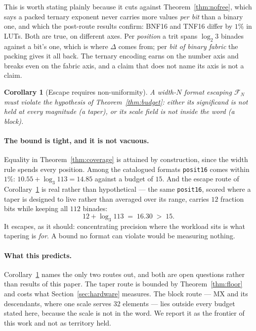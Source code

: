 \documentclass[11pt]{article}
\newtheorem{corollary}{Corollary}
\theoremstyle{definition}
\begin{document}
This is worth stating plainly because it cuts against
Theorem~\ref{thm:nofree}, which says a packed ternary exponent never carries
more values \emph{per bit} than a binary one, and which the post-route results
confirm:
BNF16 and TNF16 differ by $1\%$ in LUTs. Both are true, on different axes. Per
\emph{position} a trit spans $\log_2 3$ binades against a bit's one, which is
where $\Delta$ comes from; per \emph{bit of binary fabric} the packing gives it
all back. The ternary encoding earns on the number axis and breaks even on the
fabric axis, and a claim that does not name its axis is not a claim.

\begin{corollary}[Escape requires non-uniformity]
\label{cor:escape}
A width-$N$ format escaping $\mathcal{F}_N$ must violate the hypothesis of
Theorem~\ref{thm:budget}: either its significand is not held at every magnitude
(a taper), or its scale field is not inside the word (a block).
\end{corollary}

\paragraph{The bound is tight, and it is not vacuous.} Equality in
Theorem~\ref{thm:coverage} is attained by construction, since the width rule
spends every position. Among the catalogued formats \texttt{posit16} comes within
$1\%$: $10.55 + \log_3 113 = 14.85$ against a budget of $15$. And the escape route
of Corollary~\ref{cor:escape} is real rather than hypothetical --- the same
\texttt{posit16}, scored where a taper is designed to live rather than averaged
over its range, carries $12$ fraction bits while keeping all $112$ binades:
\[
  12 + \log_3 113 \;=\; 16.30 \;>\; 15 .
\]
It escapes, as it should: concentrating precision where the workload sits is what
tapering is \emph{for}. A bound no format can violate would be measuring nothing.

\paragraph{What this predicts.} Corollary~\ref{cor:escape} names the only two
routes out, and both are open questions rather than results of this paper. The
taper route is bounded by Theorem~\ref{thm:floor} and costs what
Section~\ref{sec:hardware} measures. The block route --- MX and its descendants,
where one scale serves 32 elements --- lies outside every budget stated here,
because the scale is not in the word. We report it as the frontier of this work
and not as territory held.
\end{document}
